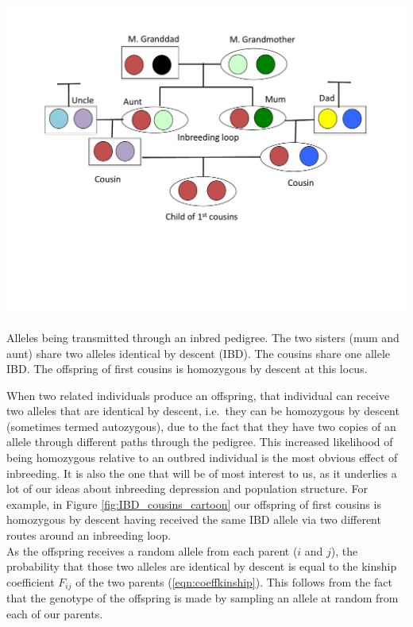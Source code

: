 \begin{marginfigure}
\begin{center}
\includegraphics[width= \textwidth]{figures/Child_first_cousins_Homozy_BD.pdf}
\end{center}
\caption{Alleles being transmitted through an inbred pedigree. The two sisters (mum and aunt) share two alleles identical by descent (IBD). The cousins share one
  allele IBD. The offspring of first cousins is homozygous by
  descent at this locus.} \label{fig:IBD_cousins_cartoon}
\end{marginfigure}
When two related individuals produce an offspring, that individual can
receive two alleles that are identical by descent, i.e.\ they
can be homozygous by descent (sometimes termed autozygous), due to the
fact that they have two copies of an allele through different paths
through the pedigree.  This increased likelihood of being homozygous
relative to an outbred individual is the most obvious effect of
inbreeding. It is also the one that will be of most interest to us, as it
underlies a lot of our ideas about inbreeding depression and
population structure. For example, in Figure \ref{fig:IBD_cousins_cartoon} our
offspring of first cousins is homozygous by descent having received
the same IBD allele via two different routes around an inbreeding loop.\\

As the offspring receives a random allele from each parent ($i$ and $j$), the
probability that those two alleles are identical by descent is equal to the
kinship coefficient $F_{ij}$ of the two parents (\eqn \ref{eqn:coeffkinship}). This follows from the fact that
the genotype of the offspring is made by sampling an allele at random from each
of our parents. %

